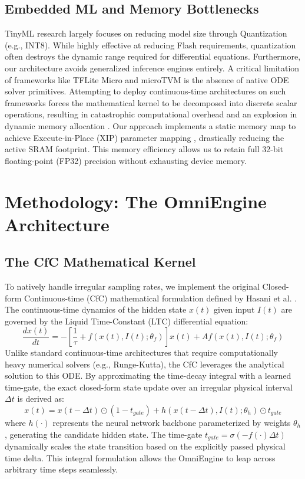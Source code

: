 \documentclass[conference]{IEEEtran}
\begin{document}
\subsection{Embedded ML and Memory Bottlenecks}
TinyML research \cite{warden2020tinyml, schottenhamml2020tinyml} largely focuses on reducing model size through Quantization (e.g., INT8). While highly effective at reducing Flash requirements, quantization often destroys the dynamic range required for differential equations. Furthermore, our architecture avoids generalized inference engines entirely. A critical limitation of frameworks like TFLite Micro \cite{david2021tflitemicro} and microTVM \cite{wang2021microtvm} is the absence of native ODE solver primitives. Attempting to deploy continuous-time architectures on such frameworks forces the mathematical kernel to be decomposed into discrete scalar operations, resulting in catastrophic computational overhead and an explosion in dynamic memory allocation \cite{banbury2021mlperf}. Our approach implements a static memory map to achieve Execute-in-Place (XIP) parameter mapping \cite{libiseller2023xip}, drastically reducing the active SRAM footprint. This memory efficiency allows us to retain full 32-bit floating-point (FP32) precision without exhausting device memory.

\section{Methodology: The OmniEngine Architecture}

\subsection{The CfC Mathematical Kernel}
To natively handle irregular sampling rates, we implement the original Closed-form Continuous-time (CfC) mathematical formulation defined by Hasani et al. \cite{hasani2022closed}. The continuous-time dynamics of the hidden state $x(t)$ given input $I(t)$ are governed by the Liquid Time-Constant (LTC) differential equation:
\begin{equation}
\frac{dx(t)}{dt} = -\left[\frac{1}{\tau} + f(x(t), I(t); \theta_f)\right] x(t) + A f(x(t), I(t); \theta_f)
\label{eq:ltc_ode}
\end{equation}
Unlike standard continuous-time architectures that require computationally heavy numerical solvers (e.g., Runge-Kutta), the CfC leverages the analytical solution to this ODE. By approximating the time-decay integral with a learned time-gate, the exact closed-form state update over an irregular physical interval $\Delta t$ is derived as:
\begin{equation}
x(t) = x(t-\Delta t) \odot \left(1 - t_{gate}\right) + h(x(t-\Delta t), I(t); \theta_h) \odot t_{gate}
\label{eq:cfc_update}
\end{equation}
where $h(\cdot)$ represents the neural network backbone parameterized by weights $\theta_h$, generating the candidate hidden state. The time-gate $t_{gate} = \sigma(-f(\cdot) \Delta t)$ dynamically scales the state transition based on the explicitly passed physical time delta. This integral formulation allows the OmniEngine to leap across arbitrary time steps seamlessly.
\end{document}
